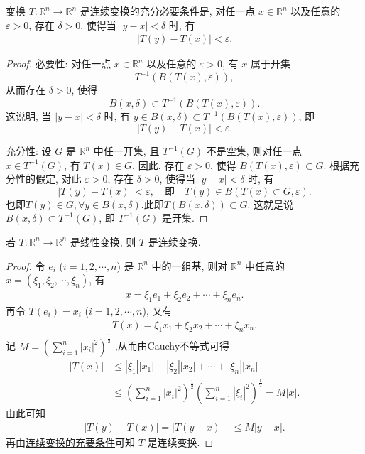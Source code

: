 \documentclass[../../main.tex]{subfiles}%
\begin{document}
\begin{theorem}[连续变换的充要条件]\label{theorem:连续变换的充要条件}
变换 $T:\mathbb{R}^n\to\mathbb{R}^n$ 是连续变换的充分必要条件是, 对任一点 $x\in\mathbb{R}^n$ 以及任意的 $\varepsilon>0$, 存在 $\delta>0$, 使得当 $|y - x|<\delta$ 时, 有
\begin{align}
|T(y) - T(x)|<\varepsilon.\label{eq:thm221}
\end{align}
\end{theorem}
\begin{proof}

{\heiti 必要性:} 对任一点 $x\in\mathbb{R}^n$ 以及任意的 $\varepsilon>0$, 有 $x$ 属于开集
\[
T^{-1}(B(T(x),\varepsilon)),
\]
从而存在 $\delta>0$, 使得
\[
B(x,\delta)\subset T^{-1}(B(T(x),\varepsilon)).
\]
这说明, 当 $|y - x|<\delta$ 时, 有 $y\in B(x,\delta)\subset T^{-1}(B(T(x),\varepsilon))$, 即
\[
|T(y) - T(x)|<\varepsilon.
\]

{\heiti 充分性:} 设 $G$ 是 $\mathbb{R}^n$ 中任一开集, 且 $T^{-1}(G)$ 不是空集, 则对任一点 $x\in T^{-1}(G)$, 有 $T(x)\in G$. 因此, 存在 $\varepsilon>0$, 使得 $B(T(x),\varepsilon)\subset G$. 根据充分性的假定, 对此 $\varepsilon>0$, 存在 $\delta>0$, 使得当 $|y - x|<\delta$ 时, 有
\[
|T(y) - T(x)|<\varepsilon,\quad \text{即}\quad T(y)\in B(T(x)\subset G,\varepsilon).
\]
也即$T(y)\in G,\forall y\in B(x,\delta)$.此即$T(B(x,\delta))\subset G$.
这就是说 $B(x,\delta)\subset T^{-1}(G)$, 即 $T^{-1}(G)$ 是开集. 
\end{proof}

\begin{proposition}
若 $T:\mathbb{R}^n\to\mathbb{R}^n$ 是线性变换, 则 $T$ 是连续变换.
\end{proposition}
\begin{proof}
令 $e_i$ ($i = 1,2,\cdots,n$) 是 $\mathbb{R}^n$ 中的一组基, 则对 $\mathbb{R}^n$ 中任意的 $x = (\xi_1,\xi_2,\cdots,\xi_n)$, 有
\begin{align*}
x = \xi_1e_1 + \xi_2e_2 + \cdots + \xi_ne_n.
\end{align*}
再令 $T(e_i) = x_i$ ($i = 1,2,\cdots,n$), 又有
\begin{align*}
T(x) = \xi_1x_1 + \xi_2x_2 + \cdots + \xi_nx_n.
\end{align*}
记 $M = \left(\sum_{i = 1}^{n}|x_i|^2\right)^{\frac{1}{2}}$ ,从而由Cauchy不等式可得
\begin{align*}
|T(x)|&\leqslant|\xi_1||x_1| + |\xi_2||x_2| + \cdots + |\xi_n||x_n|\\
&\leqslant\left(\sum_{i = 1}^{n}|x_i|^2\right)^{\frac{1}{2}}\left(\sum_{i = 1}^{n}|\xi_i|^2\right)^{\frac{1}{2}} = M|x|.
\end{align*}
由此可知
\begin{align*}
|T(y) - T(x)| = |T(y - x)|&\leqslant M|y - x|.
\end{align*}
再由\hyperref[theorem:连续变换的充要条件]{连续变换的充要条件}可知 $T$ 是连续变换. 
\end{proof}
\end{document}
